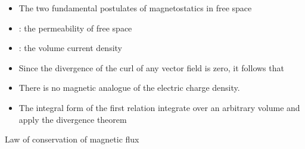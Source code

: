 \ELhold


\begin{ELjoin}

\begin{itemize}
\tightlist
\item
  The two fundamental postulates of magnetostatics in free space
\end{itemize}

\begin{ELimportant}{}


\end{ELimportant}

\end{ELjoin}

\begin{ELunit}

\begin{itemize}
\tightlist
\item
  : the permeability of free space
\item
  : the volume current density 
\item
  Since the divergence of the curl of any vector field is zero, it follows that
\end{itemize}


\end{ELunit}

\begin{ELjoin}

\begin{itemize}
\tightlist
\item
  There is no magnetic analogue of the electric charge density.
\item
  The integral form of the first relation \ELim{\ELto} integrate over an arbitrary volume  and apply the divergence theorem
\end{itemize}

\begin{ELimportant}{Law of conservation of magnetic flux}


\end{ELimportant}

\end{ELjoin}


